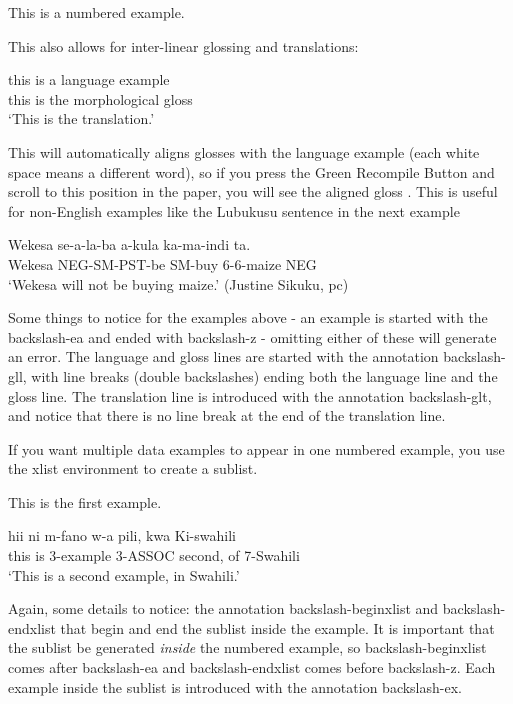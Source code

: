 \documentclass[output=paper,colorlinks,citecolor=brown,
]{langscibook}
\begin{document}
\ea 
This is a numbered example.
\z

This also allows for inter-linear glossing and translations: 

\ea 
\gll this is a language example \\
this is the morphological gloss \\
\glt `This is the translation.' 
\z 

This will automatically aligns glosses with the language example (each white space means a different word), so if you press the Green Recompile Button and scroll to this position in the paper, you will see the aligned gloss . This is useful for non-English examples like the Lubukusu sentence in the next example

\ea 
\gll Wekesa se-a-la-ba a-kula ka-ma-indi ta. \\
Wekesa NEG-SM-PST-be SM-buy 6-6-maize NEG \\ 
\glt `Wekesa will not be buying maize.' (Justine Sikuku, pc)
\z

Some things to notice for the examples above - an example is started with the backslash-ea and ended with backslash-z - omitting either of these will generate an error. The language and gloss lines are started with the annotation backslash-gll, with line breaks (double backslashes) ending both the language line and the gloss line. The translation line is introduced with the annotation backslash-glt, and notice that there is no line break at the end of the translation line.

If you want multiple data examples to appear in one numbered example, you use the xlist environment to create a sublist. 

\ea
\begin{xlist}

\ex This is the first example. 

\ex 
\gll hii ni m-fano w-a pili, kwa Ki-swahili \\
this is 3-example 3-ASSOC second, of 7-Swahili \\
\glt `This is a second example, in Swahili.' 

\end{xlist}

\z 

\noindent Again, some details to notice: the annotation backslash-begin{xlist} and backslash-end{xlist} that begin and end the sublist inside the example. It is important that the sublist be generated \textit{inside} the numbered example, so backslash-begin{xlist} comes after backslash-ea and backslash-end{xlist} comes before backslash-z. Each example inside the sublist is introduced with the annotation backslash-ex. 
\end{document}

